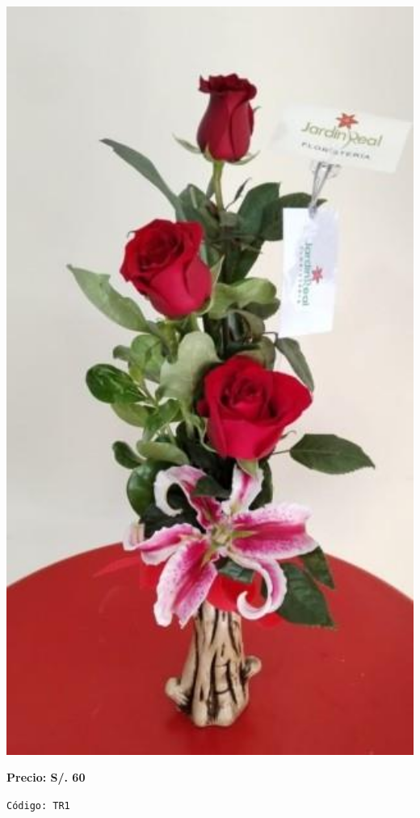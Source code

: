 \documentclass[12pt]{article}
\begin{document}
\begin{minipage}{0.35\textwidth}
    \includegraphics[width=1.0\textwidth]{imagenes_extraidas/image_7_4}
\end{minipage}
\vspace{0.3cm}
\begin{center}
   \textbf{\Large Precio: \textcolor[HTML]{228B22}{S/. 60 }}
\end{center}
\begin{center}
    \textcolor[HTML]{191970}{\texttt{Código: TR1}}
\end{center}
\end{document}

